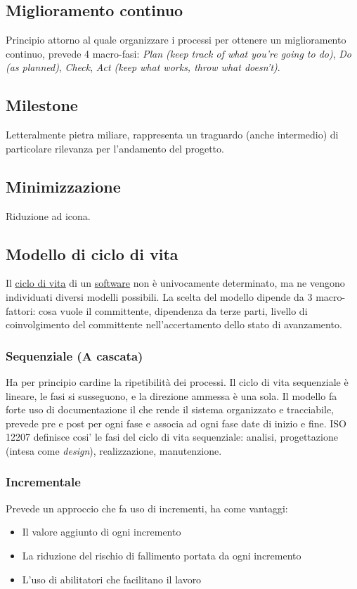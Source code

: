 	
	\subsection{Miglioramento continuo}
	\label{sec:miglioramentocontinuo}
	Principio attorno al quale organizzare i processi per ottenere un miglioramento continuo, prevede 4 macro-fasi:
	\emph{Plan (keep track of what you're going to do)}, \emph{Do (as planned)}, \emph{Check}, \emph{Act (keep what works, throw what doesn't)}.

	
	\subsection{Milestone}
	\label{sec:milestone}	
	Letteralmente pietra miliare, rappresenta un traguardo (anche intermedio) di particolare rilevanza per l'andamento del progetto.
	
	
	\subsection{Minimizzazione}
	\label{sec:minimizzazione}
	Riduzione ad icona.

	
	\subsection{Modello di ciclo di vita}
	\label{sec:modelliciclodivita}
	Il \underline{\hyperref[sec:ciclodivita]{ciclo di vita}} di un \underline{\hyperref[sec:prodottosoftware]{software}} non è univocamente determinato, ma ne vengono individuati diversi modelli possibili. La scelta del modello dipende da 3 macro-fattori: cosa vuole il committente, dipendenza da terze parti, livello di coinvolgimento del committente nell'accertamento dello stato di avanzamento.

		
		\subsubsection{Sequenziale (A cascata)}
			Ha per principio cardine la ripetibilità dei processi.
			Il ciclo di vita sequenziale è lineare, le fasi si susseguono, e la direzione
			ammessa è una sola.
			Il modello fa forte uso di documentazione il che rende il sistema organizzato e tracciabile, prevede pre e post per ogni fase e associa ad ogni fase date di inizio e fine.
ISO 12207 definisce cosi' le fasi del ciclo di vita sequenziale: analisi, progettazione (intesa come \textit{design}), realizzazione, manutenzione.

		
		\subsubsection{Incrementale}
			Prevede un approccio che fa uso di incrementi, ha come vantaggi:
			\begin{itemize}
			\item Il valore aggiunto di ogni incremento
			\item La riduzione del rischio di fallimento portata da ogni incremento
			\item L'uso di abilitatori che facilitano il lavoro
			\end{itemize}

